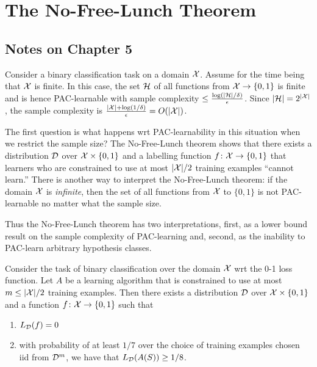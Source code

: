 \chapter{The No-Free-Lunch Theorem}

\section*{Notes on Chapter 5}

Consider a binary classification task on a domain $\mathcal{X}$. Assume for the time
being that $\mathcal{X}$ is finite. In this case, the set $\mathcal{H}$ of all functions
from $\mathcal{X} \rightarrow \{0, 1\}$ is finite and is hence PAC-learnable with
sample complexity $\leq \frac{\log (|\mathcal{H}| / \delta)}{\epsilon}$.  Since
$|\mathcal{H}| = 2^{|\mathcal{X}|}$, the sample complexity is $\frac{|\mathcal{X}| + \log (1 /
\delta)}{\epsilon} = O(|\mathcal{X}|)$.

The first question is what happens wrt PAC-learnability in this situation when
we restrict the sample size? The No-Free-Lunch theorem shows that there exists
a distribution $\mathcal{D}$ over $\mathcal{X} \times \{0, 1\}$ and a labelling function $f
\colon \mathcal{X} \rightarrow \{0, 1\}$ that learners who are  constrained to use at
most $|\mathcal{X}| / 2$ training examples ``cannot learn.'' There is another way to
interpret the No-Free-Lunch theorem: if the domain $\mathcal{X}$ is \emph{infinite},
then the set of all functions from $\mathcal{X}$ to $\{0, 1\}$ is not PAC-learnable no
matter what the sample size.  

Thus the No-Free-Lunch theorem has two interpretations, first, as a lower bound
result on the sample complexity of PAC-learning and, second, as the inability
to PAC-learn arbitrary hypothesis classes.    

\begin{theorem}
\label{thm:no_free_lunch}
Consider the task of binary classification over the domain $\mathcal{X}$ wrt the 0-1
loss function. Let $A$ be a learning algorithm that is constrained to use at
most $m \leq |\mathcal{X}| / 2$ training examples. Then there exists a distribution
$\mathcal{D}$ over $\mathcal{X} \times \{0, 1\}$ and a function $f \colon \mathcal{X} \rightarrow
\{0, 1\}$ such that 
\begin{enumerate}
    \item $L_{\mathcal{D}} (f) = 0$
    \item with probability of at least $1/7$ over the choice of training examples 
        chosen iid from $\mathcal{D}^{m}$, we have that $L_{\mathcal{D}} (A(S)) \geq 1/ 8$.
\end{enumerate}
\end{theorem} 
